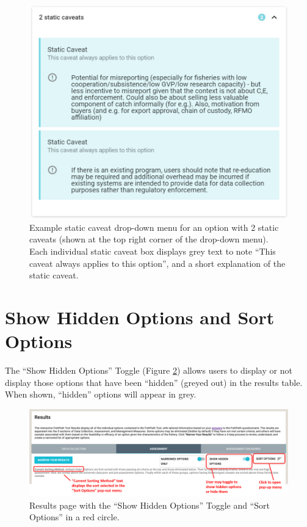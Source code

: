 \documentclass[
  11pt,
]{book}
\begin{document}
\begin{figure}

{\centering \includegraphics[width=0.75\linewidth]{images/static-cav-drop-down} 

}

\caption{Example static caveat drop-down menu for an option with 2 static caveats (shown at the top right corner of the drop-down menu). Each individual static caveat box displays grey text to note “This caveat always applies to this option”, and a short explanation of the static caveat.}\label{fig:static-cav-drop-down}
\end{figure}

\hypertarget{show-hidden-options-and-sort-options}{%
\section{Show Hidden Options and Sort Options}\label{show-hidden-options-and-sort-options}}

The ``Show Hidden Options'' Toggle (Figure \ref{fig:show-hidden-sort}) allows users to display or not display those options that have been ``hidden'' (greyed out) in the results table. When shown, ``hidden'' options will appear in grey.

\begin{figure}

{\centering \includegraphics[width=0.75\linewidth]{images/show-hidden-options-and-sort} 

}

\caption{Results page with the “Show Hidden Options” Toggle and “Sort Options” in a red circle.}\label{fig:show-hidden-sort}
\end{figure}
\end{document}
